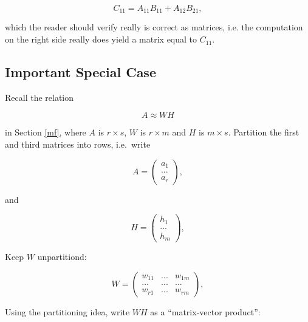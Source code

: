 \begin{equation}
C_{11} = A_{11} B_{11} + A_{12} B_{21}, 
\end{equation}

which the reader should verify really is correct as matrices, i.e. the
computation on the right side really does yield a matrix equal to $C_{11}$.

\subsection{Important Special Case}

Recall the relation 

\begin{equation}
\label{awh}
A \approx WH
\end{equation}

in Section \ref{mf}, where $A$ is $r \times s$, $W$ is $r \times m$ and
$H$ is $m \times s$.  Partition the first and third  matrices into rows, i.e.\
write


\begin{equation}
A =
\left (
\begin{array}{c}
a_1 \\
... \\
a_r 
\end{array}
\right ),
\end{equation}

and

\begin{equation}
H =
\left (
\begin{array}{c}
h_1 \\
... \\
h_m 
\end{array}
\right ),
\end{equation}

Keep $W$ unpartitiond:

\begin{equation}
W = 
\left (
\begin{array}{ccc}
w_{11} & ... & w_{1m}\\
... & ... & ... \\
w_{r1} & ... & w_{rm}
\end{array}
\right ),
\end{equation}

Using the partitioning idea, write $WH$ as a ``matrix-vector product'':

